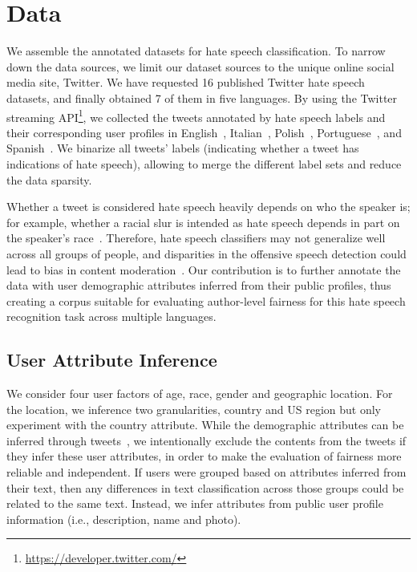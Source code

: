 \section{Data}
\label{chap5:sec:mul_data}

We assemble the annotated datasets for hate speech classification.
To narrow down the data sources, we limit our dataset sources to the unique online social media site, Twitter.
We have requested 16 published Twitter hate speech datasets, and finally obtained 7 of them in five languages.
By using the Twitter streaming API\footnote{\url{https://developer.twitter.com/}}, we collected the tweets annotated by hate speech labels and their corresponding user profiles in English~\cite{waseem2016hateful, waseem2016you, founta2018large}, Italian~\cite{sanguinetti2018italian}, Polish~\cite{ptaszynski2017learning}, Portuguese~\cite{fortuna2019hierarchically}, and Spanish~\cite{basile2019semeval}.
We binarize all tweets' labels (indicating whether a tweet has indications of hate speech), allowing to merge the different label sets and reduce the data sparsity.

Whether a tweet is considered hate speech heavily depends on who the speaker is; for example, whether a racial slur is intended as hate speech depends in part on the speaker's race~\cite{waseem2016hateful}.
Therefore, hate speech classifiers may not generalize well across all groups of people, and disparities in the offensive speech detection could lead to bias in content moderation~\cite{shen2018perception}.
Our contribution is to further annotate the data with user demographic attributes inferred from their public profiles,
thus creating a corpus suitable for evaluating author-level fairness for this hate speech recognition task across multiple languages.


\subsection{User Attribute Inference}
\label{chap5:subsec:infer}

We consider four user factors of age, race, gender and geographic location. For the location, we inference two granularities, country and US region but only experiment with the country attribute.
While the demographic attributes can be inferred through tweets~\cite{volkova2015inferring, davidson2019racial},
we intentionally exclude the contents from the tweets if they infer these user attributes, in order to make the evaluation of fairness more reliable and independent.
If users were grouped based on attributes inferred from their text, then any differences in text classification across those groups could be related to the same text. 
Instead, we infer attributes from public user profile information (i.e., description, name and photo).

